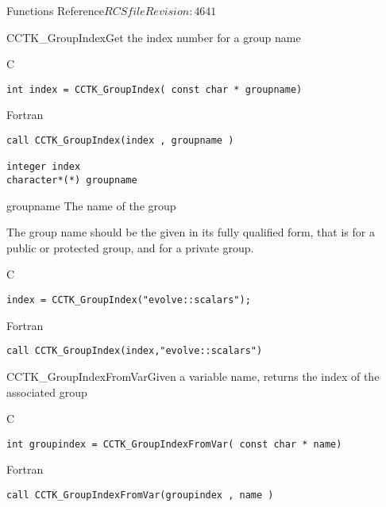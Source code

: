 \begin{cactuspart}{ Functions Reference}{$RCSfile$}{$Revision: 4641 $}
\begin{FunctionDescription}{CCTK\_GroupIndex}{Get the index number for a group name}
\label{CCTK-GroupIndex}
\begin{SynopsisSection}
\begin{Synopsis}{C}
\begin{verbatim}int index = CCTK_GroupIndex( const char * groupname)\end{verbatim}
\end{Synopsis}
\begin{Synopsis}{Fortran}
\begin{verbatim}call CCTK_GroupIndex(index , groupname )

integer index
character*(*) groupname\end{verbatim}
\end{Synopsis}
\end{SynopsisSection}
\begin{ParameterSection}
\begin{Parameter}{groupname}
The name of the group
\end{Parameter}
\end{ParameterSection}
\begin{Discussion}
The group name should be the given in its fully qualified form, that is  for a public or protected group, and  for a private group.
\end{Discussion}
\begin{ExampleSection}
\begin{Example}{C}
\begin{verbatim}
index = CCTK_GroupIndex("evolve::scalars");
\end{verbatim}
\end{Example}
\begin{Example}{Fortran}
\begin{verbatim}
call CCTK_GroupIndex(index,"evolve::scalars")
\end{verbatim}
\end{Example}
\end{ExampleSection}
\end{FunctionDescription}



\begin{FunctionDescription}{CCTK\_GroupIndexFromVar}{Given a variable name, returns the index of the associated group}
\label{CCTK-GroupIndexFromVar}
\begin{SynopsisSection}
\begin{Synopsis}{C}
\begin{verbatim}int groupindex = CCTK_GroupIndexFromVar( const char * name)\end{verbatim}
\end{Synopsis}
\begin{Synopsis}{Fortran}
\begin{verbatim}call CCTK_GroupIndexFromVar(groupindex , name )


\end{verbatim}
\end{Synopsis}
\end{SynopsisSection}
\end{FunctionDescription}
\end{cactuspart}
